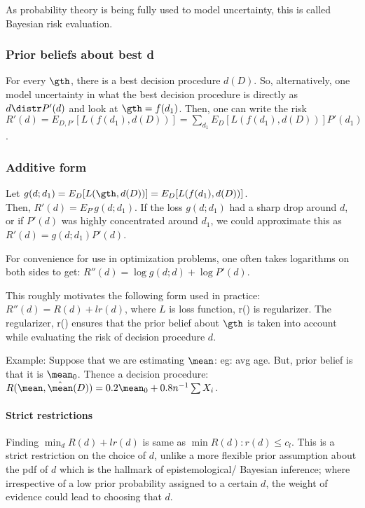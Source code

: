 \documentclass[oneside, article]{memoir}
\begin{document}
As probability theory is being fully used to model uncertainty, this is called Bayesian risk evaluation.

\subsubsection{Prior beliefs about best d}
For every $\gth$, there is a best decision procedure $d(D)$. So, alternatively, one model uncertainty in what the best decision procedure is directly as $d \distr P'(d)$ and look at $\gth = f(d_1)$. Then, one can write the risk \\$R'(d) = E_{D, P'}[L(f(d_1),d(D))] = \sum_{d_1} E_D[L(f(d_1),d(D))]P'(d_1)$.

\subsubsection{Additive form}
Let $g(d; d_1) = E_D[L(\gth,d(D))] = E_D[L(f(d_1),d(D))]$. \\Then, $R'(d) = E_{P'}g(d; d_1)$. If the loss $g(d; d_1)$ had a sharp drop around $d$, or if $P'(d)$ was highly concentrated around $d_1$, we could approximate this as $R'(d) = g(d; d_1) P'(d)$.

For convenience for use in optimization problems, one often takes logarithms on both sides to get: $R''(d) = \log g(d; d) + \log P'(d)$.

This roughly motivates the following form used in practice: $R''(d) = R(d) + l r(d)$, where $L$ is loss function, r() is regularizer. The regularizer, r() ensures that the prior belief about $\gth$ is taken into account while evaluating the risk of decision procedure $d$.

Example: Suppose that we are estimating $\mean$: eg: avg age. But, prior belief is that it is $\mean_0$. Thence a decision procedure: $R(\mean, \hat{\mean}(D))  = 0.2 \mean_0 + 0.8 n^{-1}\sum X_i$.

\paragraph{Strict restrictions}
Finding $\min_d R(d) + l r(d)$ is same as $\min R(d) : r(d) \leq c_l$. This is a strict restriction on the choice of $d$, unlike a more flexible prior assumption about the pdf of $d$ which is the hallmark of epistemological/ Bayesian inference; where irrespective of a low prior probability assigned to a certain $d$, the weight of evidence could lead to choosing that $d$.
\end{document}
